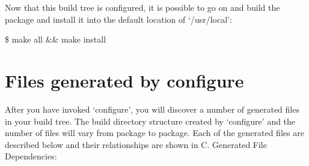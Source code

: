 \bigskip
\bigskip
Now that this build tree is configured, it is possible to go on and 
build the package and install it into the default location of `/usr/local': 

\bigskip
  \$ make all \&\& make install

\section{Files generated by configure}

After you have invoked `configure', you will discover a number of generated files in your build tree. The build directory structure created by `configure' and the number of files will vary from package to package. Each of the generated files are described below and their relationships are shown in C. Generated File Dependencies: 



